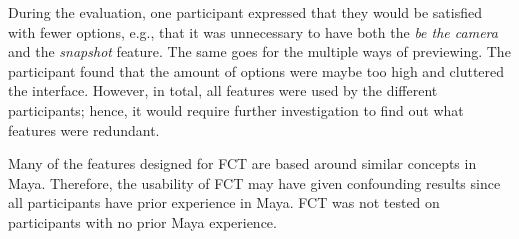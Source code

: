 During the evaluation, one participant expressed that they would be satisfied with fewer options, e.g., that it was unnecessary to have both the \textit{be the camera} and the \textit{snapshot} feature. The same goes for the multiple ways of previewing. The participant found that the amount of options were maybe too high and cluttered the interface. However, in total, all features were used by the different participants; hence, it would require further investigation to find out what features were redundant.

Many of the features designed for FCT are based around similar concepts in Maya. Therefore, the usability of FCT may have given confounding results since all participants have prior experience in Maya. FCT was not tested on participants with no prior Maya experience.

